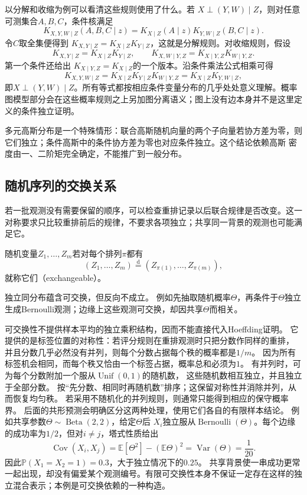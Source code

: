 以分解和收缩为例可以看清这些规则使用了什么。若
\(X\perp(Y,W)\mid Z\)，则对任意可测集合\(A,B,C\)，条件核满足
\[
  K_{X,Y,W\mid Z}(A,B,C\mid z)
  =K_{X\mid Z}(A\mid z)K_{Y,W\mid Z}(B,C\mid z).
\]
令\(C\)取全集便得到
\(K_{X,Y\mid Z}=K_{X\mid Z}K_{Y\mid Z}\)，这就是分解规则。对收缩规则，假设
\[
  K_{X,Y\mid Z}=K_{X\mid Z}K_{Y\mid Z},
  \qquad
  K_{X,W\mid Y,Z}=K_{X\mid Y,Z}K_{W\mid Y,Z}.
\]
第一个条件还给出
\(K_{X\mid Y,Z}=K_{X\mid Z}\)的一个版本。沿条件乘法公式相乘可得
\[
  K_{X,Y,W\mid Z}
  =K_{X\mid Z}K_{Y\mid Z}K_{W\mid Y,Z}
  =K_{X\mid Z}K_{Y,W\mid Z},
\]
即\(X\perp(Y,W)\mid Z\)。所有等式都按相应条件变量分布的几乎处处意义理解。概率图模型部分会在这些概率规则之上另加图分离语义；图上没有边本身并不是这里定义的条件独立证明。

多元高斯分布是一个特殊情形：联合高斯随机向量的两个子向量若协方差为零，则它们独立；条件高斯中的条件协方差为零也对应条件独立。这个结论依赖高斯
密度由一、二阶矩完全确定，不能推广到一般分布。

\subsection{随机序列的交换关系}

若一批观测没有需要保留的顺序，可以检查重排记录以后联合规律是否改变。这一对称要求只比较重排前后的规律，不要求各项独立；共享同一背景的观测也可能满足它。
\label{sec:rv-exchangeability}
\begin{definition}[可交换随机变量]
  \label{def:probability-exchangeability}
随机变量\(Z_1,\ldots,Z_m\)若对每个排列\(\pi\)都有
\[ (Z_1,\ldots,Z_m)
  \overset{\mathrm{d}}{=}(Z_{\pi(1)},\ldots,Z_{\pi(m)}), \]
就称它们（exchangeable）。
\end{definition}
独立同分布蕴含可交换，但反向不成立。
例如先抽取随机概率\(\Theta\)，再条件于\(\Theta\)独立生成Bernoulli观测；边缘上这些观测可交换，却因共享\(\Theta\)而相关。

可交换性不提供样本平均的独立乘积结构，因而不能直接代入Hoeffding证明。
它提供的是标签位置的对称性：若评分规则在重排观测时只把分数作同样的重排，
并且分数几乎必然没有并列，则每个分数占据每个秩的概率都是\(1/m\)。
因为所有标签机会相同，而每个秩又恰由一个标签占据，概率总和必须为\(1\)。
有并列时，可为每个分数附加一个服从\(\operatorname{Unif}(0,1)\)的随机数，
这些随机数相互独立，并且独立于全部分数。
按“先分数、相同时再随机数”排序；这保留对称性并消除并列，从而恢复均匀秩。
若采用不随机化的并列规则，则通常只能得到相应的保守概率界。
后面的共形预测会明确区分这两种处理，使用它们各自的有限样本结论。
例如共享参数\(\Theta\sim\operatorname{Beta}(2,2)\)，给定\(\Theta\)后
\(X_i\)独立服从\(\operatorname{Bernoulli}(\Theta)\)。每个边缘的成功率为\(1/2\)，但对\(i\ne j\)，塔式性质给出
\[
\operatorname{Cov}(X_i,X_j)
=\mathbb E[\Theta^2]-(\mathbb E\Theta)^2
=\operatorname{Var}(\Theta)=\frac1{20}.
\]
因此\(\mathbb P(X_1=X_2=1)=0.3\)，大于独立情况下的\(0.25\)。
共享背景使一串成功更常一起出现，却没有偏爱某个观测编号。有限可交换性本身不保证一定存在这样的独立混合表示；本例是可交换依赖的一种构造。

